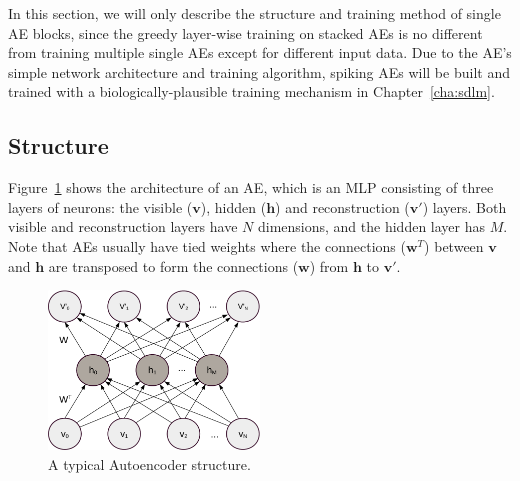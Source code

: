 In this section, we will only describe the structure and training method of single AE blocks, since the greedy layer-wise training on stacked AEs is no different from training multiple single AEs except for different input data.
Due to the AE's simple network architecture and training algorithm, spiking AEs will be built and trained with a biologically-plausible training mechanism in Chapter~\ref{cha:sdlm}.

\subsection{Structure}
Figure~\ref{fig:AE} shows the architecture of an AE, which is an MLP consisting of three layers of neurons: the visible ($\mathbf{v}$), hidden ($\mathbf{h}$) and reconstruction ($\mathbf{v'}$) layers.
Both visible and reconstruction layers have $N$ dimensions, and the hidden layer has $M$.
Note that AEs usually have tied weights where the connections ($\mathbf{w}^T$) between $\mathbf{v}$ and $\mathbf{h}$ are transposed to form the connections ($\mathbf{w}$) from $\mathbf{h}$ to $\mathbf{v'}$.


\begin{figure}
	\centering
	\includegraphics[width=0.5\textwidth]{pics_sdlm/AE.pdf}
	\caption{A typical Autoencoder structure.}
	\label{fig:AE}
\end{figure}


